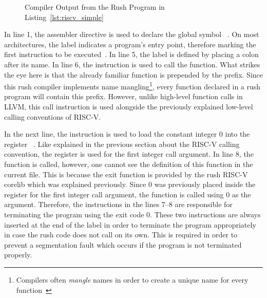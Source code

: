 
\begin{wrapfigure}{L}{0.5\textwidth}
	\centering
	\caption{Compiler Output from the Rush Program in Listing~\ref{lst:riscv_simple}}\label{lst:riscv_simple_asm}
\end{wrapfigure}

In line 1, the  assembler directive is used to declare the global symbol ~\cite[p~.36]{Patterson2017}.
On most architectures, the  label indicates a program's entry point, therefore marking the first instruction to be executed~\cite[p.~19]{Zhirkov2017-wk}.
In line 5, the  label is defined by placing a colon after its name.
In line 6, the  instruction is used to call the  function.
What strikes the eye here is that the already familiar  function is prepended by the  prefix.
Since this rush compiler implements name mangling\footnote{Compilers often \emph{mangle} names in order to create a unique name for every function~\cite[pp.~119-120]{Levine2000}},
every function declared in a rush program will contain this prefix.
However, unlike high-level function calls in LLVM, this call instruction is used alongside the previously explained low-level calling conventions of RISC-V.

In the next line, the  instruction is used to load the constant integer 0 into the register ~\cite[reference]{Patterson2017}.
Like explained in the previous section about the RISC-V calling convention,
the register  is used for the first integer call argument.
In line 8, the  function is called, however, one cannot see the definition of this function in the current file.
This is because the exit function is provided by the rush RISC-V corelib which was explained previously.
Since 0 was previously placed inside the register for the first integer call argument, the  function is called using 0 as the argument.
Therefore, the instructions in the lines 7--8 are responsible for terminating the program using the exit code 0.
These two instructions are always inserted at the end of the  label in order to terminate the program appropriately in case the rush code does not call  on its own.
This is required in order to prevent a segmentation fault which occurs if the program is not terminated properly.

